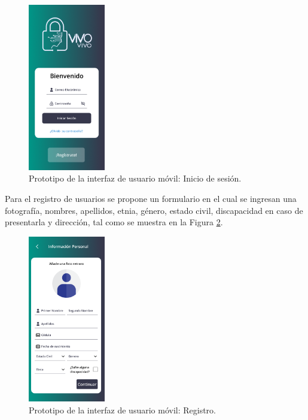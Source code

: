 \begin{figure}[H]
    \centering
    \includegraphics[width=0.3\textwidth]{chapters/III-resultados-y-discusion/resources/images/prototipo-inicio-sesion-mobile.png}
    \caption{Prototipo de la interfaz de usuario móvil: Inicio de sesión.}
    \label{fig:prototipo-inicio-sesion-mobile}
\end{figure}

Para el registro de usuarios se propone un formulario en el cual se ingresan una fotografía, nombres, apellidos, etnia, género, estado civil,
discapacidad en caso de presentarla y dirección, tal como se muestra en la Figura \ref{fig:prototipo-registro-mobile}.

\begin{figure}[H]
    \centering
    \includegraphics[width=0.3\textwidth]{chapters/III-resultados-y-discusion/resources/images/prototipo-registro-mobile.png}
    \caption{Prototipo de la interfaz de usuario móvil: Registro.}
    \label{fig:prototipo-registro-mobile}
\end{figure}

